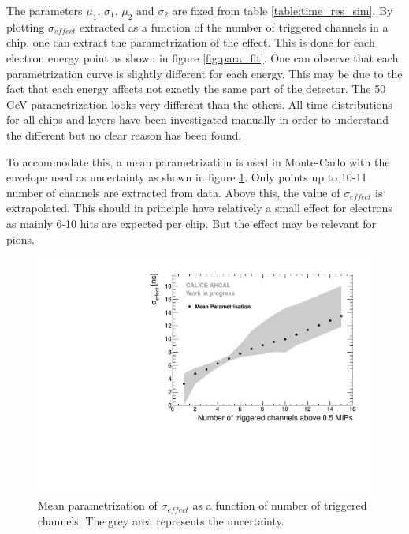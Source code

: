 The parameters $\mu_1$, $\sigma_1$, $\mu_2$ and $\sigma_2$ are fixed from table \ref{table:time_res_sim}. By plotting $\sigma_{effect}$ extracted as a function of the number of triggered channels in a chip, one can extract the parametrization of the effect. This is done for each electron energy point as shown in figure \ref{fig:para_fit}. One can observe that each parametrization curve is slightly different for each energy. This may be due to the fact that each energy affects not exactly the same part of the detector.
The 50 GeV parametrization looks very different than the others. All time distributions for all chips and layers have been investigated manually in order to understand the different but no clear reason has been found.

To accommodate this, a mean parametrization is used in Monte-Carlo with the envelope used as uncertainty as shown in figure \ref{fig:mean_para}. Only points up to 10-11 number of channels are extracted from data. Above this, the value of $\sigma_{effect}$ is extrapolated. This should in principle have relatively a small effect for electrons as mainly 6-10 hits are expected per chip. But the effect may be relevant for pions.

\begin{figure}[htbp!]
	\centering
	\includegraphics[width=0.7\linewidth]{../Thesis_Plots/Timing/Electrons/Plots/MeanParametrisationWithSystErrors.pdf}
	\caption{Mean parametrization of $\sigma_{effect}$ as a function of number of triggered channels. The grey area represents the uncertainty.}
	\label{fig:mean_para}
\end{figure}
